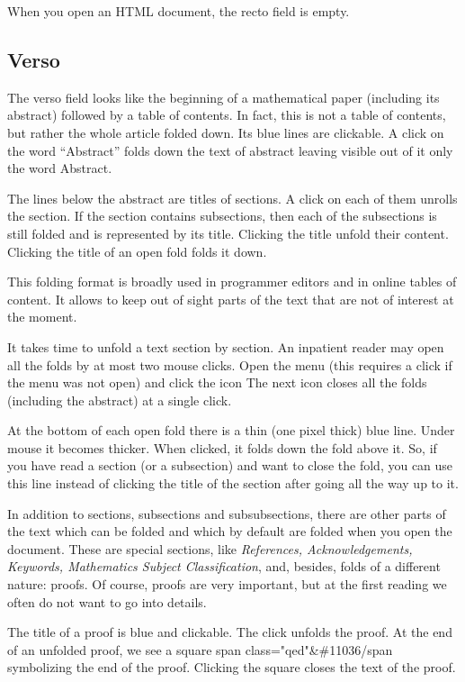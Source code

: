 \documentclass{article}
\begin{document}
When you open an HTML document, the recto field is empty. 

\subsection{Verso}\label{s1.2}
The verso field  looks like the beginning 
of a mathematical paper (including its abstract) followed by a 
table of contents. 
In fact, this is not a table of contents, but rather the whole
article folded down. Its blue lines are clickable. A click on the word 
``Abstract'' folds down the text of abstract leaving visible out of it 
only the word Abstract. 

The lines below the abstract are titles of sections. 
A click on each of them unrolls the section. 
If the section contains subsections, then each of the
subsections is still folded and is represented by its title. 
Clicking the title unfold their content. Clicking the title of an 
open fold folds it down.

This folding  format is broadly used in programmer editors and in online 
tables of content. It allows to keep out of sight parts of the text that 
are not of interest at the moment. 

It takes time to unfold a text section by section. An inpatient reader may 
open all the folds by at most two mouse clicks. Open the menu 
(this requires a click if the menu was not open) and click the icon 
The next icon 
 closes all the folds
(including the abstract) at a single click.

At the bottom of each open fold there is a thin (one pixel thick) blue line.
Under mouse it becomes thicker. When clicked, it folds down the fold above
it. So, if you have read a section (or a subsection) and want to close the
fold, you can use this line instead of clicking the title of the section
after going all the way up to it. 

In addition to sections, subsections and subsubsections, 
there are other parts of
the text which can be folded and which by default are folded when you open 
the document.
These are special sections, like {\em References, Acknowledgements, Keywords, 
Mathematics Subject Classification\/}, and, besides, folds of a 
different nature: proofs. 
Of course, proofs are very important, but at the first
reading we often do not want to go into details. 

The title of a proof is blue and clickable. The click unfolds the proof.
At the end of an unfolded proof, we see a square 
\<span class="qed"\>\&\#11036\</span\> symbolizing the end of 
the proof.
Clicking the square closes the text of the proof.
   
\end{document}
